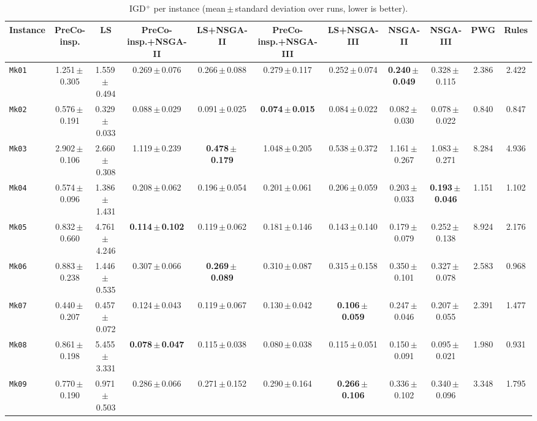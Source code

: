 \begin{table}[htbp]
\centering
\caption{IGD$^+$ per instance (mean\,$\pm$\,standard deviation over runs, lower is better).}
\label{tab:igd}
\scriptsize
\setlength{\tabcolsep}{2.5pt}
\begin{tabular}{lcccccccccc}
\toprule
Instance & PreCo-insp. & LS & PreCo-insp.+NSGA-II & LS+NSGA-II & PreCo-insp.+NSGA-III & LS+NSGA-III & NSGA-II & NSGA-III & PWG & Rules \\
\midrule
\texttt{Mk01} & 1.251\,$\pm$\,0.305 & 1.559\,$\pm$\,0.494 & 0.269\,$\pm$\,0.076 & 0.266\,$\pm$\,0.088 & 0.279\,$\pm$\,0.117 & 0.252\,$\pm$\,0.074 & \textbf{0.240\,$\pm$\,0.049} & 0.328\,$\pm$\,0.115 & 2.386 & 2.422 \\
\texttt{Mk02} & 0.576\,$\pm$\,0.191 & 0.329\,$\pm$\,0.033 & 0.088\,$\pm$\,0.029 & 0.091\,$\pm$\,0.025 & \textbf{0.074\,$\pm$\,0.015} & 0.084\,$\pm$\,0.022 & 0.082\,$\pm$\,0.030 & 0.078\,$\pm$\,0.022 & 0.840 & 0.847 \\
\texttt{Mk03} & 2.902\,$\pm$\,0.106 & 2.660\,$\pm$\,0.308 & 1.119\,$\pm$\,0.239 & \textbf{0.478\,$\pm$\,0.179} & 1.048\,$\pm$\,0.205 & 0.538\,$\pm$\,0.372 & 1.161\,$\pm$\,0.267 & 1.083\,$\pm$\,0.271 & 8.284 & 4.936 \\
\texttt{Mk04} & 0.574\,$\pm$\,0.096 & 1.386\,$\pm$\,1.431 & 0.208\,$\pm$\,0.062 & 0.196\,$\pm$\,0.054 & 0.201\,$\pm$\,0.061 & 0.206\,$\pm$\,0.059 & 0.203\,$\pm$\,0.033 & \textbf{0.193\,$\pm$\,0.046} & 1.151 & 1.102 \\
\texttt{Mk05} & 0.832\,$\pm$\,0.660 & 4.761\,$\pm$\,4.246 & \textbf{0.114\,$\pm$\,0.102} & 0.119\,$\pm$\,0.062 & 0.181\,$\pm$\,0.146 & 0.143\,$\pm$\,0.140 & 0.179\,$\pm$\,0.079 & 0.252\,$\pm$\,0.138 & 8.924 & 2.176 \\
\texttt{Mk06} & 0.883\,$\pm$\,0.238 & 1.446\,$\pm$\,0.535 & 0.307\,$\pm$\,0.066 & \textbf{0.269\,$\pm$\,0.089} & 0.310\,$\pm$\,0.087 & 0.315\,$\pm$\,0.158 & 0.350\,$\pm$\,0.101 & 0.327\,$\pm$\,0.078 & 2.583 & 0.968 \\
\texttt{Mk07} & 0.440\,$\pm$\,0.207 & 0.457\,$\pm$\,0.072 & 0.124\,$\pm$\,0.043 & 0.119\,$\pm$\,0.067 & 0.130\,$\pm$\,0.042 & \textbf{0.106\,$\pm$\,0.059} & 0.247\,$\pm$\,0.046 & 0.207\,$\pm$\,0.055 & 2.391 & 1.477 \\
\texttt{Mk08} & 0.861\,$\pm$\,0.198 & 5.455\,$\pm$\,3.331 & \textbf{0.078\,$\pm$\,0.047} & 0.115\,$\pm$\,0.038 & 0.080\,$\pm$\,0.038 & 0.115\,$\pm$\,0.051 & 0.150\,$\pm$\,0.091 & 0.095\,$\pm$\,0.021 & 1.980 & 0.931 \\
\texttt{Mk09} & 0.770\,$\pm$\,0.190 & 0.971\,$\pm$\,0.503 & 0.286\,$\pm$\,0.066 & 0.271\,$\pm$\,0.152 & 0.290\,$\pm$\,0.164 & \textbf{0.266\,$\pm$\,0.106} & 0.336\,$\pm$\,0.102 & 0.340\,$\pm$\,0.096 & 3.348 & 1.795 \\

\end{tabular}
\end{table}
